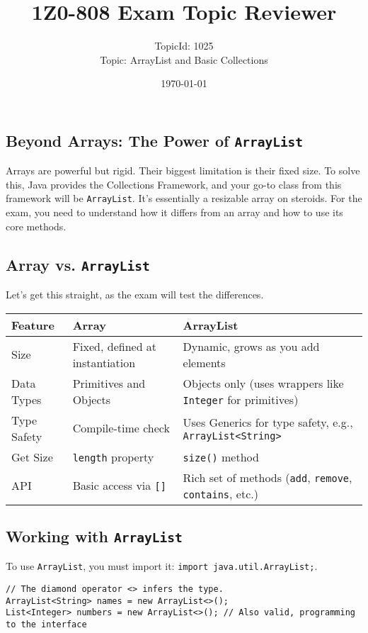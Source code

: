 \documentclass[12pt]{article}
\title{\textbf{1Z0-808 Exam Topic Reviewer}}
\author{TopicId: 1025 \\ Topic: ArrayList and Basic Collections}
\date{\today}
\begin{document}
\maketitle
\newpage\begin{enumerate}[label=(\arabic*)]
\section*{Beyond Arrays: The Power of \texttt{ArrayList}}
Arrays are powerful but rigid. Their biggest limitation is their fixed size. To solve this, Java provides the Collections Framework, and your go-to class from this framework will be \texttt{ArrayList}. It's essentially a resizable array on steroids. For the exam, you need to understand how it differs from an array and how to use its core methods.

\subsection{Array vs. \texttt{ArrayList}}
Let's get this straight, as the exam will test the differences.
\begin{tabular}{|l|l|l|}
\hline
\textbf{Feature} & \textbf{Array} & \textbf{ArrayList} \\
\hline
Size & Fixed, defined at instantiation & Dynamic, grows as you add elements \\
\hline
Data Types & Primitives and Objects & Objects only (uses wrappers like \texttt{Integer} for primitives) \\
\hline
Type Safety & Compile-time check & Uses Generics for type safety, e.g., \texttt{ArrayList<String>} \\
\hline
Get Size & \texttt{length} property & \texttt{size()} method \\
\hline
API & Basic access via \texttt{[]} & Rich set of methods (\texttt{add}, \texttt{remove}, \texttt{contains}, etc.) \\
\hline
\end{tabular}

\subsection{Working with \texttt{ArrayList}}
To use \texttt{ArrayList}, you must import it: \texttt{import java.util.ArrayList;}.
\begin{verbatim}
// The diamond operator <> infers the type.
ArrayList<String> names = new ArrayList<>();
List<Integer> numbers = new ArrayList<>(); // Also valid, programming to the interface


\end{verbatim}
\end{enumerate}
\end{document}
